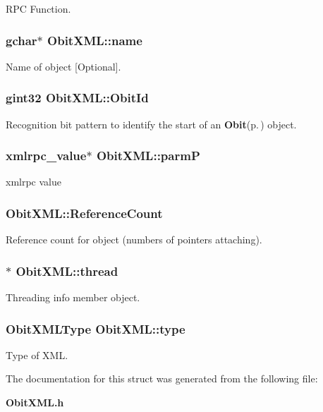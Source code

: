 RPC Function. 

\subsubsection{\setlength{\rightskip}{0pt plus 5cm}gchar$\ast$ {\bf Obit\-XML::name}}\label{structObitXML_o3}


Name of object [Optional]. 

\subsubsection{\setlength{\rightskip}{0pt plus 5cm}gint32 {\bf Obit\-XML::Obit\-Id}}\label{structObitXML_o0}


Recognition bit pattern to identify the start of an {\bf Obit}{\rm (p.\,\pageref{structObit})} object. 

\subsubsection{\setlength{\rightskip}{0pt plus 5cm}xmlrpc\_\-value$\ast$ {\bf Obit\-XML::parm\-P}}\label{structObitXML_o8}


xmlrpc value 

\subsubsection{ {\bf Obit\-XML::Reference\-Count}}\label{structObitXML_o2}


Reference count for object (numbers of pointers attaching). 

\subsubsection{$\ast$ {\bf Obit\-XML::thread}}\label{structObitXML_o4}


Threading info member object. 

\subsubsection{\setlength{\rightskip}{0pt plus 5cm}Obit\-XMLType {\bf Obit\-XML::type}}\label{structObitXML_o5}


Type of XML. 



The documentation for this struct was generated from the following file:\begin{CompactItemize}
\item 
{\bf Obit\-XML.h}\end{CompactItemize}
